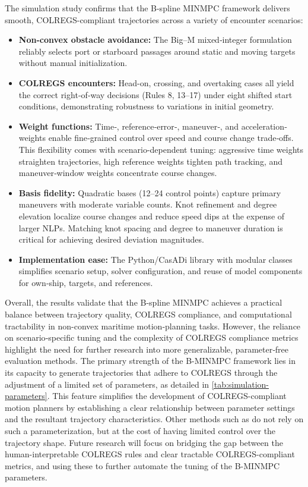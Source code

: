 The simulation study confirms that the B-spline MINMPC framework delivers smooth, COLREGS-compliant trajectories across a variety of encounter scenarios:

\begin{itemize}
  \item \textbf{Non-convex obstacle avoidance:}  
    The Big–M mixed‐integer formulation reliably selects port or starboard passages around static and moving targets without manual initialization.
  \item \textbf{COLREGS encounters:}  
    Head-on, crossing, and overtaking cases all yield the correct right‐of‐way decisions (Rules 8, 13–17) under eight shifted start conditions, demonstrating robustness to variations in initial geometry.
  \item \textbf{Weight functions:}  
    Time‐, reference‐error‐, maneuver‐, and acceleration‐weights enable fine‐grained control over speed and course change trade‐offs. This flexibility comes with scenario-dependent tuning: aggressive time weights straighten trajectories, high reference weights tighten path tracking, and maneuver‐window weights concentrate course changes. 
  \item \textbf{Basis fidelity:}  
    Quadratic bases (12–24 control points) capture primary maneuvers with moderate variable counts. Knot refinement and degree elevation localize course changes and reduce speed dips at the expense of larger NLPs. Matching knot spacing and degree to maneuver duration is critical for achieving desired deviation magnitudes.
  \item \textbf{Implementation ease:}  
    The Python/CasADi library with modular classes simplifies scenario setup, solver configuration, and reuse of model components for own‐ship, targets, and references.
\end{itemize}

Overall, the results validate that the B-spline MINMPC achieves a practical balance between trajectory quality, COLREGS compliance, and computational tractability in non-convex maritime motion‐planning tasks. However, the reliance on scenario‐specific tuning and the complexity of COLREGS compliance metrics highlight the need for further research into more generalizable, parameter‐free evaluation methods. 
The primary strength of the B-MINMPC framework lies in its capacity to generate trajectories that adhere to COLREGS through the adjustment of a limited set of parameters, as detailed in \cref{tab:simulation-parameters}. This feature simplifies the development of COLREGS-compliant motion planners by establishing a clear relationship between parameter settings and the resultant trajectory characteristics. Other methods such as \citet{Hagen2018,cho2021colreg,Menges2024} do not rely on such a parameterization, but at the cost of having limited control over the trajectory shape. 
Future research will focus on bridging the gap between the human-interpretable COLREGS rules and clear tractable COLREGS-compliant metrics, and using these to further automate the tuning of the B-MINMPC parameters.
